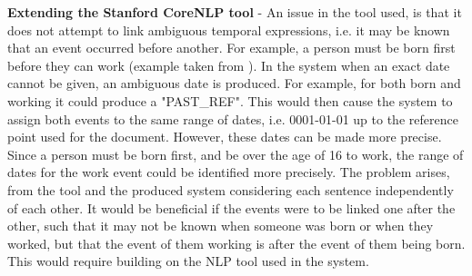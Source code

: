 \par \textbf{Extending the Stanford CoreNLP tool} - An issue in the tool used, is that it does not attempt to link ambiguous temporal expressions, i.e. it may be known that an event occurred before another. For example, a person must be born first before they can work (example taken from \cite{mccloskymanning2012}). In the system when an exact date cannot be given, an ambiguous date is produced. For example, for both born and working it could produce a "PAST\_REF". This would then cause the system to assign both events to the same range of dates, i.e. 0001-01-01 up to the reference point used for the document. However, these dates can be made more precise.  Since a person must be born first, and be over the age of 16 to work, the range of dates for the work event could be identified more precisely. The problem arises, from the tool and the produced system considering each sentence independently of each other. It would be beneficial if the events were to be linked one after the other, such that it may not be known when someone was born or when they worked, but that the event of them working is after the event of them being born. This would require building on the NLP tool used in the system.